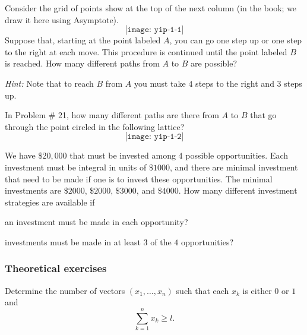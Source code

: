 \begin{problem}[Ross, \S 1, \# 21]
  Consider the grid of points show at the top of the next column (in the
  book; we draw it here using Asymptote).
  \[
    \texttt{[image: yip-1-1]}
  \]
  Suppose that, starting at the point labeled \(A\), you can go one step up
  or one step to the right at each move. This procedure is continued until
  the point labeled \(B\) is reached. How many different paths from \(A\)
  to \(B\) are possible?

  \noindent\emph{Hint:} Note that to reach \(B\) from \(A\) you must take
  \(4\) steps to the right and \(3\) steps up.
\end{problem}
\begin{solution*}
\end{solution*}

\begin{problem}[Ross, \S 1, \# 22]
  In Problem \# 21, how many different paths are there from \(A\) to \(B\)
  that go through the point circled in the following lattice?
  \[
    \texttt{[image: yip-1-2]}
  \]
\end{problem}
\begin{solution*}
\end{solution*}

\begin{problem}[Ross, \S 1, \# 33]
  We have \(\$ 20,000\) that must be invested among \(4\) possible
  opportunities. Each investment must be integral in units of \(\$1000\),
  and there are minimal investment that need to be made if one is to invest
  these opportunities. The minimal investments are \(\$2000\), \(\$2000\),
  \(\$3000\), and \(\$4000\). How many different investment strategies are
  available if
  \begin{alphlist}
  \item an investment must be made in each opportunity?
  \item investments must be made in at least \(3\) of the \(4\)
    opportunities?
  \end{alphlist}
\end{problem}
\begin{solution*}
\end{solution*}

\subsubsection{Theoretical exercises}
\begin{problem}[Ross, \S 1, \# 5]
  Determine the number of vectors \((x_1,\dotsc,x_n)\) such that each
  \(x_k\) is either \(0\) or \(1\) and
  \[
    \sum_{k=1}^n x_k\geq l.
  \]
\end{problem}
\begin{solution*}
\end{solution*}

